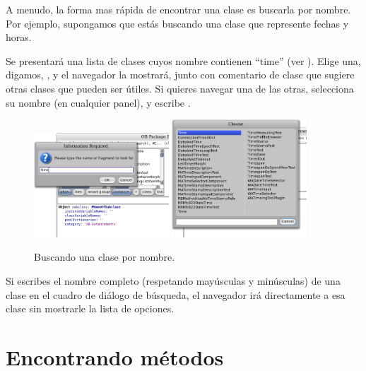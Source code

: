 \documentclass[a4paper,10pt,twoside]{book}
\begin{document}
A menudo, la forma mas r\'apida de encontrar una clase es buscarla por nombre. Por ejemplo, supongamos que est\'as buscando una clase que represente fechas y horas.

\noindent
Se presentar\'a una lista de clases cuyos nombre contienen ``time'' (ver ). Elige una, digamos, , y el navegador la mostrar\'a, junto con comentario de clase que sugiere otras clases que pueden ser \'utiles. Si quieres navegar una de las otras, selecciona su nombre (en cualquier panel), y escribe .

\begin{figure}[hbt]
\centerline{
	\includegraphics[width=0.45\textwidth]{FindIt}
	\hspace{1cm}
	\includegraphics[width=0.45\textwidth]{TimeClasses}
}
\caption{Buscando una clase por nombre.
}
\end{figure}

Si escribes el nombre completo (respetando may\'usculas y min\'usculas) de una clase en el cuadro de di\'alogo de b\'usqueda, el navegador ir\'a directamente a esa clase sin mostrarle la lista de opciones.

\section{Encontrando m\'etodos}
\end{document}
